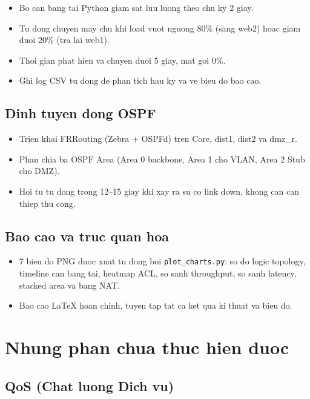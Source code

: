 \begin{itemize}
    \item Bo can bang tai Python giam sat luu luong theo chu ky 2 giay.
    \item Tu dong chuyen may chu khi load vuot nguong 80\% (sang web2) hoac giam duoi 20\% (tra lai web1).
    \item Thoi gian phat hien va chuyen duoi 5 giay, mat goi 0\%.
    \item Ghi log CSV tu dong de phan tich hau ky va ve bieu do bao cao.
\end{itemize}

\subsection{Dinh tuyen dong OSPF}

\begin{itemize}
    \item Trien khai FRRouting (Zebra + OSPFd) tren Core, dist1, dist2 va dmz\_r.
    \item Phan chia ba OSPF Area (Area 0 backbone, Area 1 cho VLAN, Area 2 Stub cho DMZ).
    \item Hoi tu tu dong trong 12--15 giay khi xay ra su co link down, khong can can thiep thu cong.
\end{itemize}

\subsection{Bao cao va truc quan hoa}

\begin{itemize}
    \item 7 bieu do PNG duoc xuat tu dong boi \texttt{plot\_charts.py}: so do logic topology, timeline can bang tai, heatmap ACL, so sanh throughput, so sanh latency, stacked area va bang NAT.
    \item Bao cao LaTeX hoan chinh, tuyen tap tat ca ket qua ki thuat va bieu do.
\end{itemize}

\section{Nhung phan chua thuc hien duoc}

\subsection{QoS (Chat luong Dich vu)}

